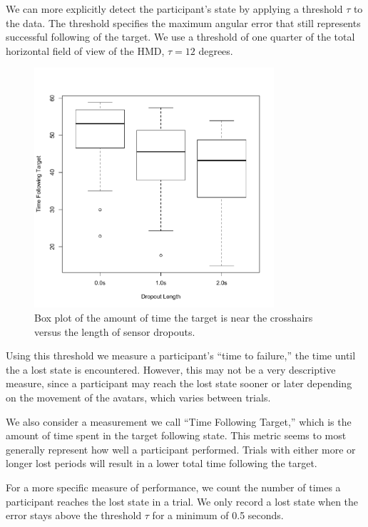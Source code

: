 \documentclass{acmsiggraph}                     %
\begin{document}

We can more explicitly detect the participant's state by applying a threshold $\tau$ to the data.  The threshold specifies the maximum angular error that still represents successful following of the target. 
We use a threshold of one quarter of the total horizontal field of view of the HMD, $\tau = 12$ degrees.
\begin{figure}[t]
	\centering
	\includegraphics[width=3.5in]{figures/tt_deadlen.pdf}
	\caption{\label{fig:tt_deadlen}Box plot of the amount of time the target is near the crosshairs versus the length of sensor dropouts.}
\end{figure}
Using this threshold we measure a participant's ``time to failure,'' the time until the a lost state is encountered.  However, this may not be a very descriptive measure, since a participant may reach the lost state sooner or later depending on the movement of the avatars, which varies between trials.

We also consider a measurement we call ``Time Following Target,'' which is the amount of time spent in the target following state.  This metric seems to most generally represent how well a participant performed.  Trials with either more or longer lost periods will result in a lower total time following the target.

For a more specific measure of performance, we count the number of times a participant reaches the lost state in a trial.  We only record a lost state when the error stays above the threshold $\tau$ for a minimum of 0.5 seconds.
\end{document}
